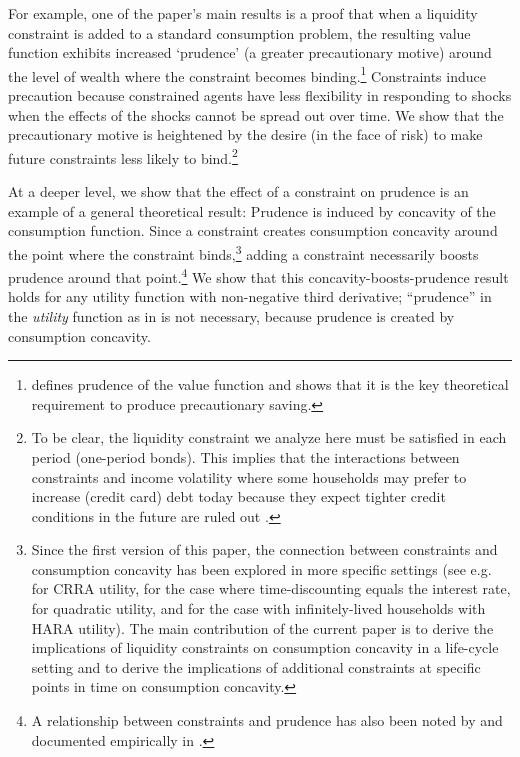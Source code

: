 For example, one of the paper's main results is a proof that when a liquidity constraint is added to a standard consumption problem, the resulting value function exhibits increased `prudence' (a greater precautionary motive) around the level of wealth where the constraint becomes binding.\footnote{\citet{kimball:smallandlarge} defines prudence of the value function and shows that it is the key theoretical requirement to produce precautionary saving.} Constraints induce precaution because constrained agents have less flexibility in responding to shocks when the effects of the shocks cannot be spread out over time. We show that the precautionary motive is heightened by the desire (in the face of risk) to make future constraints less likely to bind.\footnote{To be clear, the liquidity constraint we analyze here must be satisfied in each period (one-period bonds). This implies that the interactions between constraints and income volatility where some households may prefer to increase (credit card) debt today because they expect tighter credit conditions in the future are ruled out \citep{fulford2015important,druedahl2018precautionary}.}

At a deeper level, we show that the effect of a constraint on prudence is an example of a general theoretical result: Prudence is induced by concavity of the consumption function. Since a constraint creates consumption concavity around the point where the constraint binds,\footnote{Since the first version of this paper, the connection between constraints and consumption concavity has been explored in more specific settings (see e.g. \citet{park2006analytical} for CRRA utility,  \citet{seater1997optimal} for the case where time-discounting equals the interest rate, \citet{nishiyama2012concavity} for quadratic utility, and \citet{holm2018consumption} for the case with infinitely-lived households with HARA utility). The main contribution of the current paper is to derive the implications of liquidity constraints on consumption concavity in a life-cycle setting and to derive the implications of additional constraints at specific points in time on consumption concavity.} adding a constraint necessarily boosts prudence around that point.\footnote{A relationship between constraints and prudence has also been noted by \citet{lee2007degree} and documented empirically in \citet{lee2010precautionary}.} We show that this concavity-boosts-prudence result holds for any utility function with non-negative third derivative; ``prudence'' in the \textit{utility} function as in  \citet{kimball:smallandlarge} is not necessary, because prudence is created by consumption concavity.

